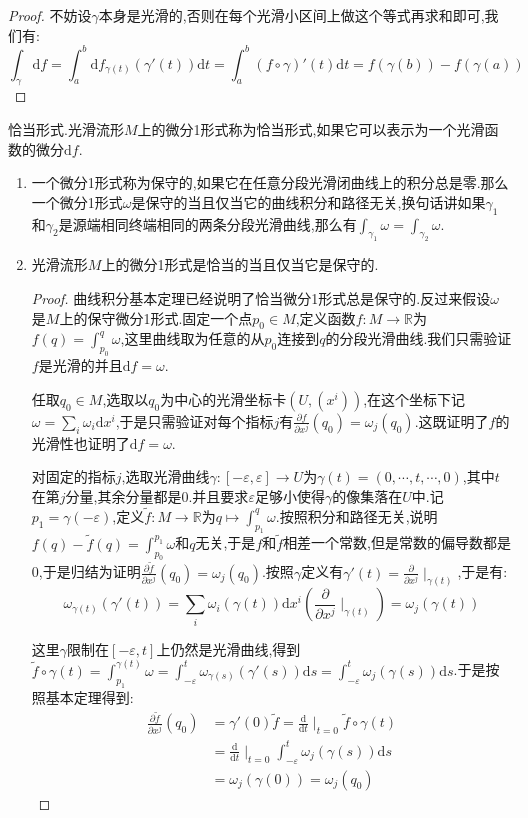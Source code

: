 \begin{enumerate}
\begin{proof}
    	不妨设$\gamma$本身是光滑的,否则在每个光滑小区间上做这个等式再求和即可,我们有:
    	$$\int_{\gamma}\mathrm{d}f=\int_a^b\mathrm{d}f_{\gamma(t)}(\gamma'(t))\mathrm{d}t=\int_a^b(f\circ\gamma)'(t)\mathrm{d}t=f(\gamma(b))-f(\gamma(a))$$
    \end{proof}
\end{enumerate}

恰当形式.光滑流形$M$上的微分1形式称为恰当形式,如果它可以表示为一个光滑函数的微分$\mathrm{d}f$.
\begin{enumerate}
	\item 一个微分1形式称为保守的,如果它在任意分段光滑闭曲线上的积分总是零.那么一个微分1形式$\omega$是保守的当且仅当它的曲线积分和路径无关,换句话讲如果$\gamma_1$和$\gamma_2$是源端相同终端相同的两条分段光滑曲线,那么有$\int_{\gamma_1}\omega=\int_{\gamma_2}\omega$.
	\item 光滑流形$M$上的微分1形式是恰当的当且仅当它是保守的.
	\begin{proof}
		
		曲线积分基本定理已经说明了恰当微分1形式总是保守的.反过来假设$\omega$是$M$上的保守微分1形式.固定一个点$p_0\in M$,定义函数$f:M\to\mathbb{R}$为$f(q)=\int_{p_0}^q\omega$,这里曲线取为任意的从$p_0$连接到$q$的分段光滑曲线.我们只需验证$f$是光滑的并且$\mathrm{d}f=\omega$.
		
		任取$q_0\in M$,选取以$q_0$为中心的光滑坐标卡$(U,(x^i))$,在这个坐标下记$\omega=\sum_i\omega_i\mathrm{d}x^i$,于是只需验证对每个指标$j$有$\frac{\partial f}{\partial x^j}(q_0)=\omega_j(q_0)$.这既证明了$f$的光滑性也证明了$\mathrm{d}f=\omega$.
		
		对固定的指标$j$,选取光滑曲线$\gamma:[-\varepsilon,\varepsilon]\to U$为$\gamma(t)=(0,\cdots,t,\cdots,0)$,其中$t$在第$j$分量,其余分量都是0.并且要求$\varepsilon$足够小使得$\gamma$的像集落在$U$中.记$p_1=\gamma(-\varepsilon)$,定义$\widetilde{f}:M\to\mathbb{R}$为$q\mapsto\int_{p_1}^q\omega$.按照积分和路径无关,说明$f(q)-\widetilde{f}(q)=\int_{p_0}^{p_1}\omega$和$q$无关,于是$f$和$\widetilde{f}$相差一个常数,但是常数的偏导数都是0,于是归结为证明$\frac{\partial\widetilde{f}}{\partial x^j}(q_0)=\omega_j(q_0)$.按照$\gamma$定义有$\gamma'(t)=\frac{\partial}{\partial x^j}\mid_{\gamma(t)}$,于是有:$$\omega_{\gamma(t)}(\gamma'(t))=\sum_i\omega_i(\gamma(t))\mathrm{d}x^i\left(\frac{\partial}{\partial x^j}\mid_{\gamma(t)}\right)=\omega_j(\gamma(t))$$
		
		这里$\gamma$限制在$[-\varepsilon,t]$上仍然是光滑曲线,得到$\widetilde{f}\circ\gamma(t)=\int_{p_1}^{\gamma(t)}\omega=\int_{-\varepsilon}^t\omega_{\gamma(s)}(\gamma'(s))\mathrm{d}s=\int_{-\varepsilon}^t\omega_j(\gamma(s))\mathrm{d}s$.于是按照基本定理得到:
		\begin{align*}
		\frac{\partial\widetilde{f}}{\partial x^j}(q_0)&=\gamma'(0)\widetilde{f}=\frac{\mathrm{d}}{\mathrm{d}t}\mid_{t=0}\widetilde{f}\circ\gamma(t)\\&=\frac{\mathrm{d}}{\mathrm{d}t}\mid_{t=0}\int_{-\varepsilon}^t\omega_j(\gamma(s))\mathrm{d}s\\&=\omega_j(\gamma(0))=\omega_j(q_0)
		\end{align*}
	\end{proof}
\end{enumerate}

